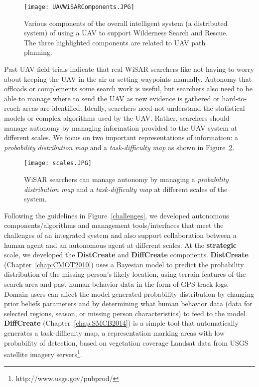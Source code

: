 \begin{figure}
\centering
\texttt{[image: UAVWiSARComponents.JPG]}
\caption{Various components of the overall intelligent system (a distributed system) of using a UAV to support Wilderness Search and Rescue. The three highlighted components are related to UAV path planning.}
\label{SystemComponents}
\end{figure}

Past UAV field trials indicate that real WiSAR searchers like not having to worry about keeping the UAV in the air or setting waypoints manually. Autonomy that offloads or complements some search work is useful, but searchers also need to be able to manage where to send the UAV as new evidence is gathered or hard-to-reach areas are identified. Ideally, searchers need not understand the statistical models or complex algorithms used by the UAV. Rather, searchers should manage autonomy by managing information provided to the UAV system at different scales. We focus on two important representations of information: a \textit{probability distribution map} and a \textit{task-difficulty map} as shown in Figure~\ref{Scales}.

\begin{figure}
\centering
\texttt{[image: scales.JPG]}
\caption{WiSAR searchers can manage autonomy by managing a \textit{probability distribution map} and a \textit{task-difficulty map} at different scales of the system.}
\label{Scales}
\end{figure}

Following the guidelines in Figure~\ref{challenges}, we developed autonomous components/algorithms and management tools/interfaces that meet the challenges of an integrated system and also support collaboration between a human agent and an autonomous agent at different scales. At  the \textbf{strategic} scale, we developed the \textbf{DistCreate} and \textbf{DiffCreate} components. \textbf{DistCreate} (Chapter~\ref{chap:CMOT2010}) uses a Bayesian model to predict the probability distribution of the missing person's likely location, using terrain features of the search area and past human behavior data in the form of GPS track logs. Domain users can affect the model-generated probability distribution by changing prior beliefs parameters and by determining what human behavior data (data for selected regions, season, or missing person characteristics) to feed to the model. \textbf{DiffCreate} (Chapter~\ref{chap:SMCB2014}) is a simple tool that automatically generates a task-difficulty map, a representation marking areas with low probability of detection, based on vegetation coverage Landsat data from USGS satellite imagery servers\footnote{http://www.usgs.gov/pubprod/}. 

